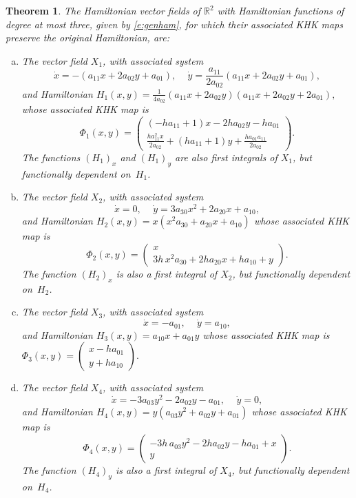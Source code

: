 \documentclass[11pt]{article}
\newtheorem {theorem} {Theorem}%
\newcommand{\R}{{\mathbb R}}
\begin{document}
\begin{theorem}\label{t:Hamiltonians de R2}
The Hamiltonian vector fields of $\R^2$ with Hamiltonian functions of degree at most three, given by \eqref{e:genham}, for which their associated KHK maps preserve the original Hamiltonian, are:
\begin{enumerate}[(a)]
    \item The vector field $X_1$, with associated system
    $$\dot{x}=-\left(a_{11} x +2 a_{02} y + a_{01}\right),\,\quad
    \dot{y}=\dfrac{a_{11}}{2 a_{02}}\left(a_{11} x +2 a_{02} y + a_{01}\right),
    $$
    and Hamiltonian
    $H_1(x,y)=\frac{1}{4 a_{02}}\left(a_{11} x +2 a_{02} y\right) \left(a_{11} x +2 a_{02} y+2 a_{01}\right),$ whose associated KHK map is $$\Phi_1(x,y)= \left(\begin{array}{c}
\left(-h a_{11}+1\right) x -2 h a_{02} y-h a_{01}
\\
 \frac{h a_{11}^{2} x}{2 a_{02}}+\left(h a_{11}+1\right) y +\frac{h a_{01} a_{11}}{2 a_{02}}
\end{array}\right).
$$
The functions $(H_{1})_{x}$ and $(H_{1})_{y}$ are also first integrals of $X_1$, but functionally dependent on~$H_1$.
        \item The vector field $X_2$, with associated system
            $$\dot{x}=0,\, \quad
    \dot{y}=3  a_{30} x^{2}+2 a_{20}x+a_{10},
    $$
    and Hamiltonian $H_2(x,y)=x \left(x^{2} a_{30}+a_{20} x+a_{10}\right)$ whose associated KHK map is
    $$\Phi_2(x,y)=\left(\begin{array}{c}
x
\\
 3 h \,x^{2} a_{30}+2 h a_{20} x+h a_{10}+y
\end{array}\right).
$$
 The function $(H_{2})_{x}$ is also a first integral of $X_2$, but functionally dependent on~$H_2$.

      \smallskip
    \item The vector field $X_3$, with associated system
    $$
    \dot{x}=-a_{01},\, \quad \dot{y}=a_{10},
    $$
    and Hamiltonian $H_3(x,y)=a_{10} x +a_{01} y$ whose associated KHK map is $
\Phi_3(x,y)=\left(\begin{array}{c}
x-h a_{01}
\\
 y+h a_{10}
\end{array}\right).
$



    \smallskip

        \item The vector field $X_4$, with associated system
    $$
\dot{x}=-3 a_{03} y^{2}-2 a_{02} y-a_{01},\, \quad \dot{y}=0,
    $$
    and Hamiltonian $H_4(x,y)=y \left(a_{03} y^{2}+a_{02} y+a_{01}\right)$ whose associated KHK map is $$
\Phi_4(x,y)=\left(\begin{array}{c}
-3 h \,a_{03} y^{2}-2 h a_{02} y-h a_{01}+x
\\
 y
\end{array}\right).
$$
 The function $(H_{4})_{y}$ is also a first integral of $X_4$, but functionally dependent on~$H_4$.




\end{enumerate}
\end{theorem}
\end{document}
